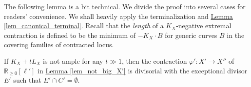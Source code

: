 The following lemma is a bit technical. 
We divide the proof into several cases for readers' convenience. 
We shall heavily apply the terminalization and {\hyperref[lem_canonical_terminal]{Lemma  \ref*{lem_canonical_terminal}}}.
Recall that the \textit{length} of a $K_X$-negative extremal contraction is defined to be the minimum of $-K_X\cdot B$ for generic curves $B$ in the covering families of contracted locus.



\begin{lemme}\label{lem_bir-intersectC}
If $K_X+tL_X$ is not ample for any $t\gg 1$, then the contraction $\varphi':X'\to X''$ of $\mathbb{R}_{\geqslant  0}[\ell']$ in {\hyperref[lem_not_big_X']{Lemma \ref*{lem_not_big_X'}}} is  divisorial  with the exceptional divisor  $E'$ such that   $E'\cap C'=\emptyset$.
\end{lemme}


